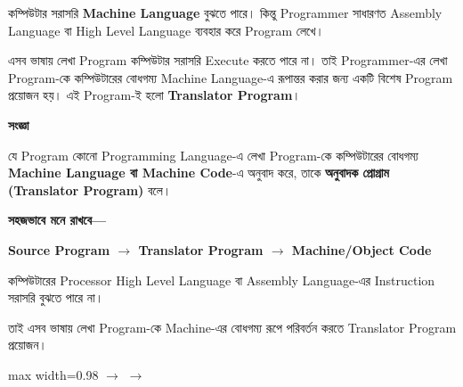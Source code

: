 
কম্পিউটার সরাসরি \textbf{Machine Language} বুঝতে পারে।
কিন্তু Programmer সাধারণত Assembly Language বা High Level
Language ব্যবহার করে Program লেখে।

এসব ভাষায় লেখা Program কম্পিউটার সরাসরি Execute করতে পারে না।
তাই Programmer-এর লেখা Program-কে কম্পিউটারের বোধগম্য
Machine Language-এ রূপান্তর করার জন্য একটি বিশেষ Program
প্রয়োজন হয়। এই Program-ই হলো \textbf{Translator Program}।


\begin{definitionbox}

\textbf{\color{darkTeal}সংজ্ঞা}

যে Program কোনো Programming Language-এ লেখা Program-কে
কম্পিউটারের বোধগম্য \textbf{Machine Language বা Machine Code}-এ
অনুবাদ করে, তাকে
\textbf{অনুবাদক প্রোগ্রাম (Translator Program)} বলে।

\end{definitionbox}

\textbf{সহজভাবে মনে রাখবে—}

\begin{center}

\textbf{
Source Program
\(\longrightarrow\)
Translator Program
\(\longrightarrow\)
Machine/Object Code
}

\end{center}


কম্পিউটারের Processor High Level Language বা Assembly Language-এর
Instruction সরাসরি বুঝতে পারে না।

তাই এসব ভাষায় লেখা Program-কে Machine-এর বোধগম্য রূপে পরিবর্তন
করতে Translator Program প্রয়োজন।

\begin{center}
\begin{adjustbox}{max width=0.98\linewidth}
\quad
\(\longrightarrow\)
\quad
{}
\quad
\(\longrightarrow\)
\quad
{}
\end{adjustbox}
\end{center}

